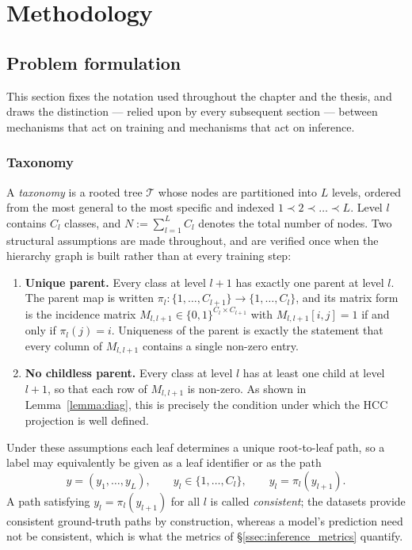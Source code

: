 \chapter{Methodology}

\section{Problem formulation}
\label{sec:methodology_problem}

This section fixes the notation used throughout the chapter and the thesis, and
draws the distinction --- relied upon by every subsequent section --- between
mechanisms that act on training and mechanisms that act on inference.

\subsection{Taxonomy}

A \emph{taxonomy} is a rooted tree $\mathcal{T}$ whose nodes are partitioned into
$L$ levels, ordered from the most general to the most specific and indexed
$1\prec 2\prec\dots\prec L$. Level $l$ contains $C_l$ classes, and
$N:=\sum_{l=1}^{L}C_l$ denotes the total number of nodes. Two structural
assumptions are made throughout, and are verified once when the hierarchy graph
is built rather than at every training step:

\begin{enumerate}
    \item \textbf{Unique parent.} Every class at level $l+1$ has exactly one
    parent at level $l$. The parent map is written
    $\pi_l:\{1,\dots,C_{l+1}\}\to\{1,\dots,C_l\}$, and its matrix form is the
    incidence matrix $M_{l,l+1}\in\{0,1\}^{C_l\times C_{l+1}}$ with
    $M_{l,l+1}[i,j]=1$ if and only if $\pi_l(j)=i$. Uniqueness of the parent is
    exactly the statement that every column of $M_{l,l+1}$ contains a single
    non-zero entry.
    \item \textbf{No childless parent.} Every class at level $l$ has at least one
    child at level $l+1$, so that each row of $M_{l,l+1}$ is non-zero. As shown in
    Lemma~\ref{lemma:diag}, this is precisely the condition under which the HCC
    projection is well defined.
\end{enumerate}

Under these assumptions each leaf determines a unique root-to-leaf path, so a
label may equivalently be given as a leaf identifier or as the path
\[
y=(y_1,\dots,y_L),\qquad y_l\in\{1,\dots,C_l\},\qquad y_l=\pi_l(y_{l+1}).
\]
A path satisfying $y_l=\pi_l(y_{l+1})$ for all $l$ is called \emph{consistent};
the datasets provide consistent ground-truth paths by construction, whereas a
model's prediction need not be consistent, which is what the metrics of
\S\ref{ssec:inference_metrics} quantify.

